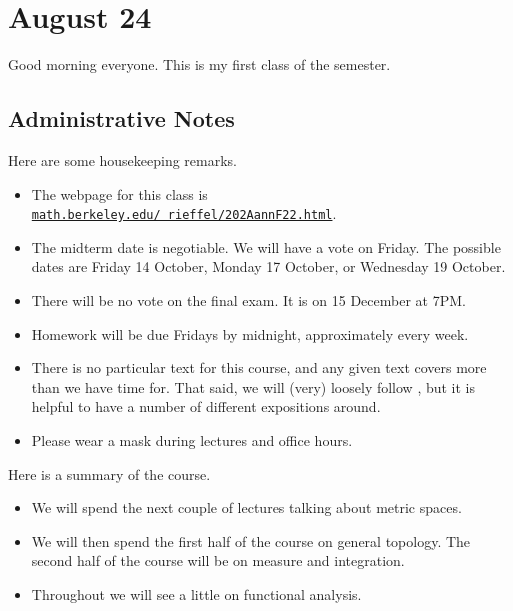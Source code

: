 \documentclass[../notes.tex]{subfiles}
\begin{document}
\section{August 24}

Good morning everyone. This is my first class of the semester.

\subsection{Administrative Notes}
Here are some housekeeping remarks.
\begin{itemize}
	\item The webpage for this class is \texttt{\href{https://math.berkeley.edu/~rieffel/202AannF22.html}{math.berkeley.edu/~rieffel/202AannF22.html}}.
	\item The midterm date is negotiable. We will have a vote on Friday. The possible dates are Friday 14 October, Monday 17 October, or Wednesday 19 October.
	\item There will be no vote on the final exam. It is on 15 December at 7PM.
	\item Homework will be due Fridays by midnight, approximately every week.
	\item There is no particular text for this course, and any given text covers more than we have time for. That said, we will (very) loosely follow \cite{lang-analysis}, but it is helpful to have a number of different expositions around.
	\item Please wear a mask during lectures and office hours.
\end{itemize}
Here is a summary of the course.
\begin{itemize}
	\item We will spend the next couple of lectures talking about metric spaces.
	\item We will then spend the first half of the course on general topology. The second half of the course will be on measure and integration.
	\item Throughout we will see a little on functional analysis.
\end{itemize}
\end{document}
